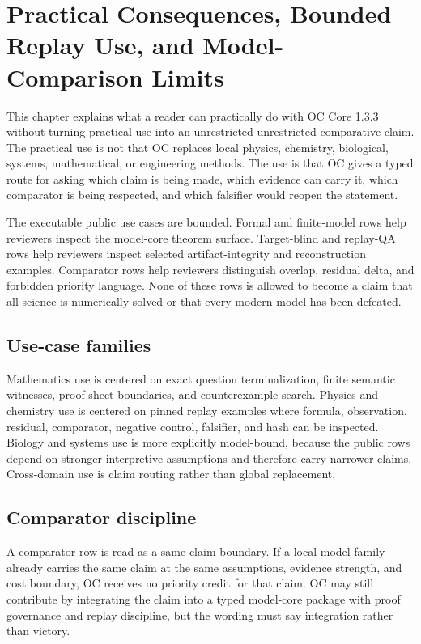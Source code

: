 \section{Practical Consequences, Bounded Replay Use, and Model-Comparison Limits}

\label{sec:oc-core-1-3-practical-utility}

This chapter explains what a reader can practically do with OC Core 1.3.3 without turning practical use into an unrestricted unrestricted comparative claim. The practical use is not that OC replaces local physics, chemistry, biological, systems, mathematical, or engineering methods. The use is that OC gives a typed route for asking which claim is being made, which evidence can carry it, which comparator is being respected, and which falsifier would reopen the statement.


The executable public use cases are bounded. Formal and finite-model rows help reviewers inspect the model-core theorem surface. Target-blind and replay-QA rows help reviewers inspect selected artifact-integrity and reconstruction examples. Comparator rows help reviewers distinguish overlap, residual delta, and forbidden priority language. None of these rows is allowed to become a claim that all science is numerically solved or that every modern model has been defeated.


\subsection{Use-case families}

Mathematics use is centered on exact question terminalization, finite semantic witnesses, proof-sheet boundaries, and counterexample search. Physics and chemistry use is centered on pinned replay examples where formula, observation, residual, comparator, negative control, falsifier, and hash can be inspected. Biology and systems use is more explicitly model-bound, because the public rows depend on stronger interpretive assumptions and therefore carry narrower claims. Cross-domain use is claim routing rather than global replacement.


\subsection{Comparator discipline}

A comparator row is read as a same-claim boundary. If a local model family already carries the same claim at the same assumptions, evidence strength, and cost boundary, OC receives no priority credit for that claim. OC may still contribute by integrating the claim into a typed model-core package with proof governance and replay discipline, but the wording must say integration rather than victory.


